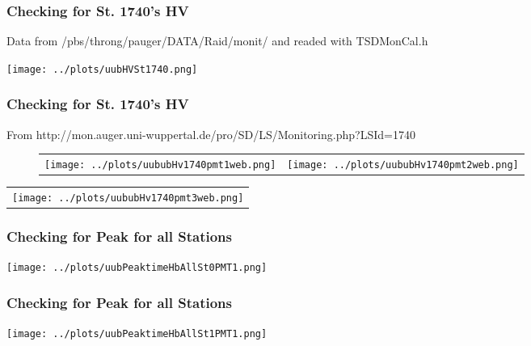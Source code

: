 \documentclass[aspectratio=169]{beamer}
\begin{document}
\begin{frame}
  \frametitle{Checking for St. 1740's HV}
  Data from /pbs/throng/pauger/DATA/Raid/monit/ and readed with TSDMonCal.h
  \centering
  \vspace{0.5cm}

  \texttt{[image: ../plots/uubHVSt1740.png]}
\end{frame}

\begin{frame}
  \frametitle{Checking for St. 1740's HV}
  From http://mon.auger.uni-wuppertal.de/pro/SD/LS/Monitoring.php?LSId=1740
  \begin{figure}
    \centering
    \begin{tabularx}{\textwidth}{CC}
      \texttt{[image: ../plots/uububHv1740pmt1web.png]}
      &
      \texttt{[image: ../plots/uububHv1740pmt2web.png]}
    \end{tabularx}
  \end{figure}

  \begin{center}
    \begin{tabular}{c}
      \texttt{[image: ../plots/uububHv1740pmt3web.png]}
    \end{tabular}
  \end{center}
\end{frame}

\begin{frame}
  \frametitle{Checking for Peak for all Stations}
  \centering
  \texttt{[image: ../plots/uubPeaktimeHbAllSt0PMT1.png]}
\end{frame}

\begin{frame}
  \frametitle{Checking for Peak for all Stations}
  \centering
  \texttt{[image: ../plots/uubPeaktimeHbAllSt1PMT1.png]}
\end{frame}
\end{document}
